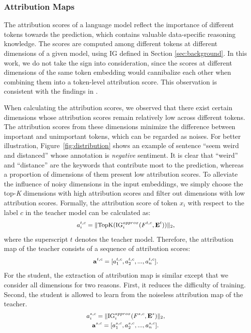 \documentclass[11pt]{article}
\begin{document}
\subsubsection{Attribution Maps}
The attribution scores of a language model reflect the importance of different tokens towards the prediction, which contains valuable data-specific reasoning knowledge. 
The scores are computed among different tokens at different dimensions of a given model, using IG defined in Section \ref{sec:background}. In this work, we do not take the sign into consideration, since the scores at different dimensions of the same token embedding would cannibalize each other when combining them into a token-level attribution score. This observation is consistent with the findings in \citep{atanasova-etal-2020-diagnostic}. 

When calculating the attribution scores, we observed that there exist certain dimensions whose attribution scores remain relatively low across different tokens. The attribution scores from these dimensions minimize the difference between important and unimportant tokens, which can be regarded as noises. For better illustration, Figure~\ref{fig:distribution} shows an example of sentence ``seem weird and distanced'' whose annotation is \emph{negative} sentiment. It is clear that ``weird'' and ``distance'' are the keywords that contribute most to the prediction, whereas a proportion of dimensions of them present low attribution scores. To alleviate the influence of noisy dimensions in the input embeddings, we simply choose the top-\textit{K} dimensions with high attribution scores and filter out dimensions with low attribution scores. Formally, the attribution score of token $x_i$ with respect to the label $c$ in the teacher model can be calculated as:
\begin{equation}
\small
\begin{aligned}
    a_i^{t,c} = \Vert \text{TopK}(\text{IG}_{i}^{approx}(F^{t,c},\mathbf{E}^t))\Vert_2,
\end{aligned}
\end{equation}
where the superscript $t$ denotes the teacher model. Therefore, the attribution map of the teacher consists of a sequence of attribution scores:
\begin{equation}
\small
\begin{aligned}
    \mathbf{a}^{t,c} = [a_1^{t,c},a_2^{t,c},...,a_n^{t,c}].
\end{aligned}
\end{equation}
For the student, the extraction of attribution map is similar except that we consider all dimensions for two reasons. First, it reduces the difficulty of training. Second, the student is allowed to learn from the noiseless attribution map of the teacher.
\begin{equation}
\small
\begin{split}
    a_i^{s,c}=\Vert \text{IG}_{i}^{approx}(F^{s,c},\mathbf{E}^s)\Vert_2, \\
    \mathbf{a}^{s,c}=[a_1^{s,c},a_2^{s,c},...,a_n^{s,c}]. \ \ \
\end{split}
\end{equation}
\end{document}
